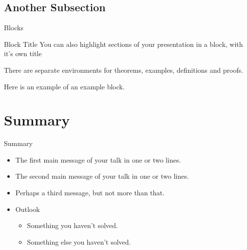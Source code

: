 \documentclass{beamer}
\begin{document}
\subsection{Another Subsection}

\begin{frame}{Blocks}
    \begin{block}{Block Title}
        You can also highlight sections of your presentation in a block, with it's own title
    \end{block}
    \begin{theorem}
        There are separate environments for theorems, examples, definitions and proofs.
    \end{theorem}
    \begin{example}
        Here is an example of an example block.
    \end{example}
\end{frame}

\section*{Summary}

\begin{frame}{Summary}
    \begin{itemize}
        \item
            The \alert{first main message} of your talk in one or two lines.
        \item
            The \alert{second main message} of your talk in one or two lines.
        \item
            Perhaps a \alert{third message}, but not more than that.
    \end{itemize}

    \begin{itemize}
        \item
            Outlook
            \begin{itemize}
                \item
                    Something you haven't solved.
                \item
                    Something else you haven't solved.
            \end{itemize}
    \end{itemize}
\end{frame}
\end{document}
